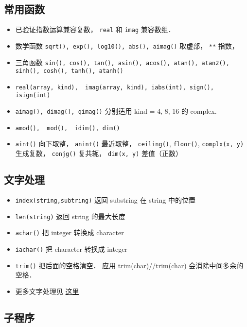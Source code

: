 \subsection{常用函数}
\begin{itemize}
\item 已验证指数运算兼容复数， \verb`real` 和 \verb`imag` 兼容数组．
\item 数学函数 \verb`sqrt(), exp(), log10(), abs(), aimag()` 取虚部， \verb`**` 指数， 
\item 三角函数 \verb`sin(), cos(), tan(), asin(), acos(), atan(), atan2(), sinh(), cosh(), tanh(), atanh()`
\item \verb`real(array, kind),  imag(array, kind), iabs(int), sign(), isign(int)`
\item \verb`aimag(), dimag(), qimag()` 分别适用 kind = 4, 8, 16 的 complex.
\item \verb`amod(),  mod(),  idim(), dim()`
\item \verb`aint()` 向下取整， \verb`anint()` 最近取整， \verb`ceiling()`, \verb`floor()`, \verb`complx(x, y)` 生成复数， \verb`conjg()` 复共轭， \verb`dim(x, y)` 差值（正数）
\end{itemize}

\subsection{文字处理}
\begin{itemize}
\item \verb`index(string,subtring)` 返回 substring 在 string 中的位置
\item \verb`len(string)` 返回 string 的最大长度
\item \verb`achar()` 把 integer 转换成 character
\item \verb`iachar()` 把 character 转换成 integer
\item \verb`trim()` 把后面的空格清空． 应用  trim(char)//trim(char) 会消除中间多余的空格．
\item 更多文字处理见 \href{http://www.tutorialspoint.com/fortran/fortran_characters.htm}{这里}
\end{itemize}

\subsection{子程序}
